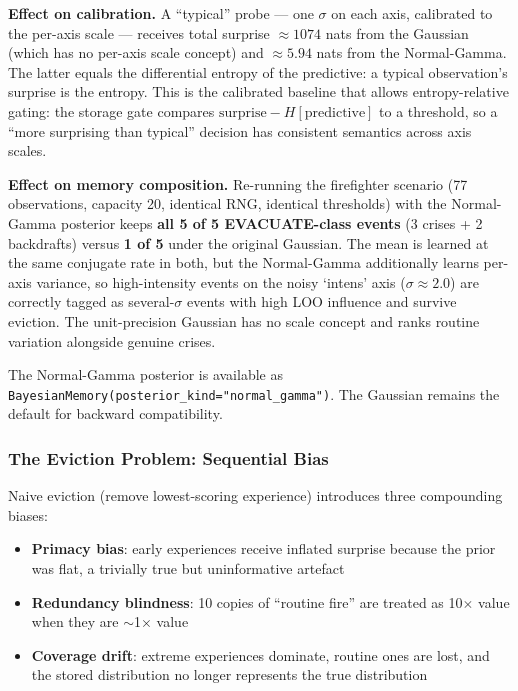 \documentclass[11pt]{article}
\begin{document}
\textbf{Effect on calibration.} A ``typical'' probe --- one $\sigma$ on each axis, calibrated to the per-axis scale --- receives total surprise $\approx 1074$ nats from the Gaussian (which has no per-axis scale concept) and $\approx 5.94$ nats from the Normal-Gamma. The latter equals the differential entropy of the predictive: a typical observation's surprise is the entropy. This is the calibrated baseline that allows entropy-relative gating: the storage gate compares $\text{surprise} - H[\text{predictive}]$ to a threshold, so a ``more surprising than typical'' decision has consistent semantics across axis scales.

\textbf{Effect on memory composition.} Re-running the firefighter scenario (77 observations, capacity 20, identical RNG, identical thresholds) with the Normal-Gamma posterior keeps \textbf{all 5 of 5 EVACUATE-class events} (3 crises + 2 backdrafts) versus \textbf{1 of 5} under the original Gaussian. The mean is learned at the same conjugate rate in both, but the Normal-Gamma additionally learns per-axis variance, so high-intensity events on the noisy `intens' axis ($\sigma \approx 2.0$) are correctly tagged as several-$\sigma$ events with high LOO influence and survive eviction. The unit-precision Gaussian has no scale concept and ranks routine variation alongside genuine crises.

The Normal-Gamma posterior is available as \texttt{BayesianMemory(posterior\_kind="normal\_gamma")}. The Gaussian remains the default for backward compatibility.

\subsubsection{The Eviction Problem: Sequential Bias}

Naive eviction (remove lowest-scoring experience) introduces three compounding biases:

\begin{itemize}
    \item \textbf{Primacy bias}: early experiences receive inflated surprise because the prior was flat, a trivially true but uninformative artefact
    \item \textbf{Redundancy blindness}: 10 copies of ``routine fire'' are treated as 10$\times$ value when they are $\sim$1$\times$ value
    \item \textbf{Coverage drift}: extreme experiences dominate, routine ones are lost, and the stored distribution no longer represents the true distribution
\end{itemize}
\end{document}
